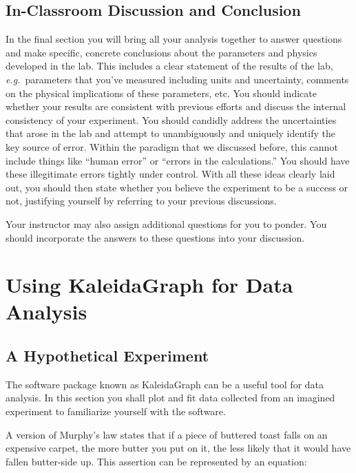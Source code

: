 \subsection{In-Classroom Discussion and Conclusion}
In the final section you will bring all your analysis 
together to answer questions and make 
specific, concrete conclusions about the parameters and physics developed in 
the lab. This includes a clear statement of the results of the lab, 
{\it e.g.}~parameters that you've measured including units and uncertainty, 
comments on the physical implications of these parameters, etc. You should 
indicate whether your results are consistent with previous efforts and discuss 
the internal consistency of your experiment. You should candidly address the 
uncertainties that arose in the lab and attempt to unambiguously and uniquely 
identify the key source of error. Within the paradigm that we discussed before,
this cannot include things like ``human error'' or ``errors in the 
calculations.'' You should have these illegitimate errors tightly under 
control. With all these ideas clearly laid out, you should then state whether 
you believe the experiment to be a success or not, justifying yourself by 
referring to your previous discussions.

Your instructor may also assign additional questions for you to ponder. You 
should incorporate the answers to these questions into your discussion.

\vfill
\pagebreak

\renewcommand{\thesection}{\thechapter.W1}

\section{Using KaleidaGraph for Data Analysis} %
\label{sec:hypoexp}
\subsection{A Hypothetical Experiment}

The software package known as KaleidaGraph can be a useful tool for
data analysis. In this section you shall plot and fit data collected from an imagined experiment to familiarize yourself with the software.

A version of Murphy's law states that if a piece of buttered toast falls on an expensive carpet, the more butter you put on it, the less likely that it would have fallen butter-side up. This assertion can be represented by an equation:

